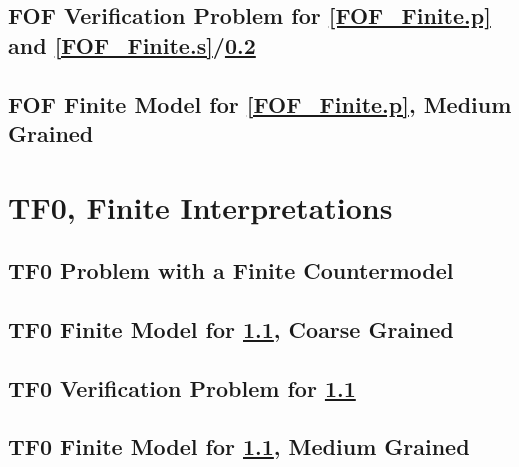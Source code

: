\documentclass{easychair}
\begin{document}
\newpage
\subsection{FOF Verification Problem for \ref{FOF_Finite.p} and 
            \ref{FOF_Finite.s}/\ref{FOF_Finite_Medium.s}}
\label{FOF_Finite.s.p}
\begin{small}

\end{small}

\newpage
\subsection{FOF Finite Model for \ref{FOF_Finite.p}, Medium Grained}
\label{FOF_Finite_Medium.s}
\begin{small}

\end{small}

\newpage
\section{TF0, Finite Interpretations}
\label{TF0Finite}

\subsection{TF0 Problem with a Finite Countermodel}
\label{TFF_Finite.p}
\begin{small}

\end{small}

\newpage
\subsection{TF0 Finite Model for \ref{TFF_Finite.p}, Coarse Grained}
\label{TFF_Finite.s}
\begin{small}

\end{small}

\newpage
\subsection{TF0 Verification Problem for \ref{TFF_Finite.p}}
\label{TFF_Finite.s.p}
\begin{small}

\end{small}

\newpage
\subsection{TF0 Finite Model for \ref{TFF_Finite.p}, Medium Grained}
\label{TFF_Finite_Medium.s}
\begin{small}

\end{small}
\end{document}
